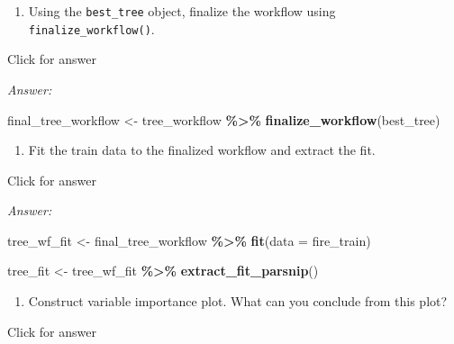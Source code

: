 \documentclass[
]{book}
\newenvironment{Shaded}{\begin{snugshade}}{\end{snugshade}}
\newcommand{\AttributeTok}[1]{\textcolor[rgb]{0.13,0.29,0.53}{#1}}
\newcommand{\FunctionTok}[1]{\textcolor[rgb]{0.13,0.29,0.53}{\textbf{#1}}}
\newcommand{\NormalTok}[1]{#1}
\newcommand{\OtherTok}[1]{\textcolor[rgb]{0.56,0.35,0.01}{#1}}
\newcommand{\SpecialCharTok}[1]{\textcolor[rgb]{0.81,0.36,0.00}{\textbf{#1}}}
\providecommand{\tightlist}{%
  \setlength{\itemsep}{0pt}\setlength{\parskip}{0pt}}
\begin{document}
\begin{enumerate}
\def\labelenumi{\alph{enumi}.}
\setcounter{enumi}{7}
\tightlist
\item
  Using the \texttt{best\_tree} object, finalize the workflow using \texttt{finalize\_workflow()}.
\end{enumerate}

Click for answer

\emph{Answer:}

\begin{Shaded}
\begin{Highlighting}[]
\NormalTok{final\_tree\_workflow }\OtherTok{\textless{}{-}}\NormalTok{ tree\_workflow }\SpecialCharTok{\%\textgreater{}\%} \FunctionTok{finalize\_workflow}\NormalTok{(best\_tree)}
\end{Highlighting}
\end{Shaded}

\begin{enumerate}
\def\labelenumi{\roman{enumi}.}
\tightlist
\item
  Fit the train data to the finalized workflow and extract the fit.
\end{enumerate}

Click for answer

\emph{Answer:}

\begin{Shaded}
\begin{Highlighting}[]
\NormalTok{tree\_wf\_fit }\OtherTok{\textless{}{-}}\NormalTok{ final\_tree\_workflow }\SpecialCharTok{\%\textgreater{}\%} \FunctionTok{fit}\NormalTok{(}\AttributeTok{data =}\NormalTok{ fire\_train)}
\end{Highlighting}
\end{Shaded}

\begin{Shaded}
\begin{Highlighting}[]
\NormalTok{tree\_fit }\OtherTok{\textless{}{-}}\NormalTok{ tree\_wf\_fit }\SpecialCharTok{\%\textgreater{}\%}  \FunctionTok{extract\_fit\_parsnip}\NormalTok{()}
\end{Highlighting}
\end{Shaded}

\begin{enumerate}
\def\labelenumi{\alph{enumi}.}
\setcounter{enumi}{9}
\tightlist
\item
  Construct variable importance plot. What can you conclude from this plot?
\end{enumerate}

Click for answer
\end{document}
